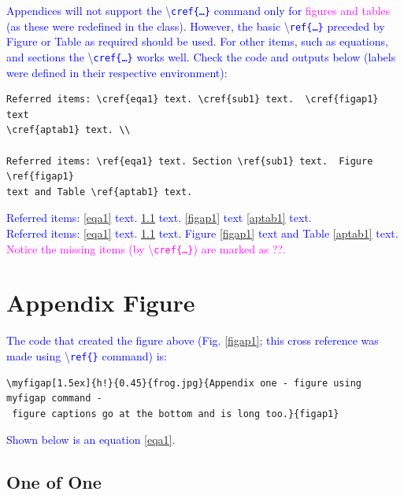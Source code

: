 \documentclass[phd,showgrids]{ndsu-thesis-2022}
\newcommand\italk[1]{\textcolor{blue}{#1}}  %
\newcommand\cmd[1]{\textbackslash\texttt{#1}}  %
\begin{document}
\italk{Appendices will not support the \cmd{cref\{\ldots\}} command only for \textcolor{magenta}{figures and tables} (as these were redefined in the class). However, the basic \cmd{ref\{\ldots\}} preceded by Figure or Table as required should be used. For other items, such as equations, and sections the \cmd{cref\{\ldots\}} works well. Check the code and outputs below (labels were defined in their respective environment):}

{\singlespacing
\begin{verbatim}
Referred items: \cref{eqa1} text. \cref{sub1} text.  \cref{figap1} text 
\cref{aptab1} text. \\

Referred items: \ref{eqa1} text. Section \ref{sub1} text.  Figure \ref{figap1} 
text and Table \ref{aptab1} text.
\end{verbatim}
}

\italk{Referred items: \cref{eqa1} text. \cref{sub1} text.  \cref{figap1} text \cref{aptab1} text. \\
Referred items: \ref{eqa1} text. \ref{sub1} text.  Figure \ref{figap1} text and Table \ref{aptab1} text.
\\ \textcolor{magenta}{Notice the missing items (by \cmd{cref\{\ldots\}}) are marked as ??.}}

\section{Appendix Figure}


\italk{The code that created the figure above (Fig. \ref{figap1}; this cross reference was made using \cmd{ref\{\}} command) is:}

{\onehalfspacing
\begin{verbatim}
\myfigap[1.5ex]{h!}{0.45}{frog.jpg}{Appendix one - figure using myfigap command -
 figure captions go at the bottom and is long too.}{figap1}
\end{verbatim}
}

\italk{Shown below is an equation \cref{eqa1}. } 


\subsection{One of One}
\label{sub1}
\kant[2]
\end{document}
